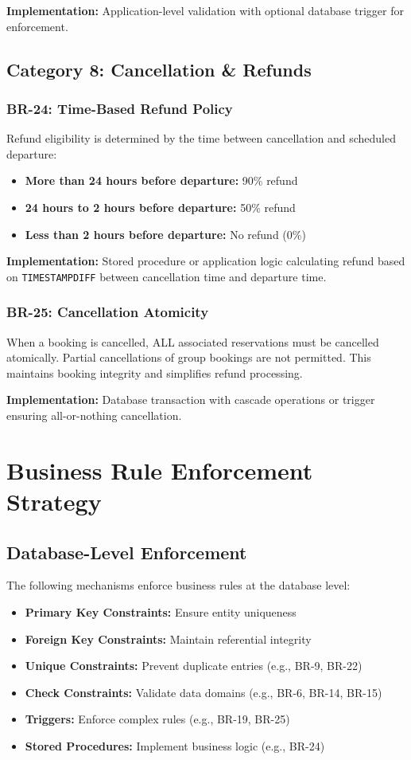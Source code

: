 \documentclass[12pt,a4paper,openany]{report}
\begin{document}
\textbf{Implementation:} Application-level validation with optional database trigger for enforcement.

\subsection{Category 8: Cancellation \& Refunds}

\subsubsection{BR-24: Time-Based Refund Policy}
Refund eligibility is determined by the time between cancellation and scheduled departure:
\begin{itemize}
    \item \textbf{More than 24 hours before departure:} 90\% refund
    \item \textbf{24 hours to 2 hours before departure:} 50\% refund
    \item \textbf{Less than 2 hours before departure:} No refund (0\%)
\end{itemize}

\textbf{Implementation:} Stored procedure or application logic calculating refund based on \texttt{TIMESTAMPDIFF} between cancellation time and departure time.

\subsubsection{BR-25: Cancellation Atomicity}
When a booking is cancelled, ALL associated reservations must be cancelled atomically. Partial cancellations of group bookings are not permitted. This maintains booking integrity and simplifies refund processing.

\textbf{Implementation:} Database transaction with cascade operations or trigger ensuring all-or-nothing cancellation.

\section{Business Rule Enforcement Strategy}

\subsection{Database-Level Enforcement}
The following mechanisms enforce business rules at the database level:
\begin{itemize}
    \item \textbf{Primary Key Constraints:} Ensure entity uniqueness
    \item \textbf{Foreign Key Constraints:} Maintain referential integrity
    \item \textbf{Unique Constraints:} Prevent duplicate entries (e.g., BR-9, BR-22)
    \item \textbf{Check Constraints:} Validate data domains (e.g., BR-6, BR-14, BR-15)
    \item \textbf{Triggers:} Enforce complex rules (e.g., BR-19, BR-25)
    \item \textbf{Stored Procedures:} Implement business logic (e.g., BR-24)
\end{itemize}
\end{document}
